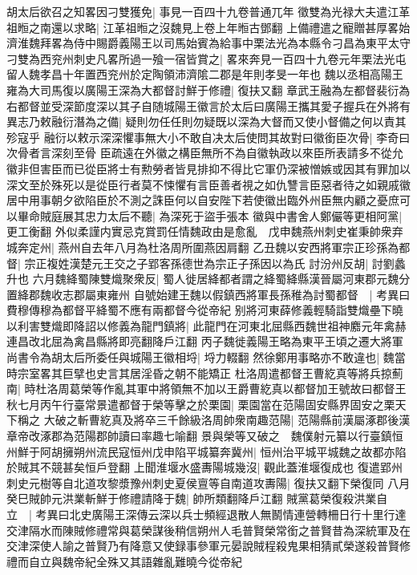 胡太后欲召之知畧因刁雙獲免|{
	事見一百四十九卷普通兀年}
徵雙為光禄大夫遣江革祖暅之南還以求略|{
	江革祖暅之沒魏見上卷上年暅古鄧翻}
上備禮遣之寵贈甚厚畧始濟淮魏拜畧為侍中賜爵義陽王以司馬始賓為給事中栗法光為本縣令刁昌為東平太守刁雙為西兖州刺史凡畧所過一飱一宿皆賞之|{
	畧來奔見一百四十九卷元年栗法光屯留人魏孝昌十年置西兖州於定陶領沛濟隂二郡是年則孝旻一年也}
魏以丞相高陽王雍為大司馬復以廣陽王深為大都督討鮮于修禮|{
	復扶又翻}
章武王融為左都督裴衍為右都督並受深節度深以其子自随城陽王徽言於太后曰廣陽王攜其愛子握兵在外將有異志乃敕融衍潛為之備|{
	疑則勿任任則勿疑既以深為大督而又使小督備之何以責其殄寇乎}
融衍以敕示深深懼事無大小不敢自决太后使問其故對曰徽銜臣次骨|{
	李奇曰次骨者言深刻至骨}
臣疏遠在外徽之構臣無所不為自徽執政以來臣所表請多不從允徽非但害臣而已從臣將士有勲勞者皆見排抑不得比它軍仍深被憎嫉或因其有罪加以深文至於殊死以是從臣行者莫不悚懼有言臣善者視之如仇讐言臣惡者待之如親戚徽居中用事朝夕欲陷臣於不測之誅臣何以自安陛下若使徽出臨外州臣無内顧之憂庶可以畢命賊庭展其忠力太后不聽|{
	為深死于盜手張本}
徽與中書舍人鄭儼等更相阿黨|{
	更工衡翻}
外似柔謹内實忌克賞罰任情魏政由是愈亂　戊申魏燕州刺史崔秉帥衆弃城奔定州|{
	燕州自去年八月為杜洛周所圍燕因肩翻}
乙丑魏以安西將軍宗正珍孫為都督|{
	宗正複姓漢楚元王交之子郢客孫德世為宗正子孫因以為氏}
討汾州反胡|{
	討劉蠡升也}
六月魏絳蜀陳雙熾聚衆反|{
	蜀人徙居絳都者謂之絳蜀絳縣漢晉屬河東郡元魏分置絳郡魏收志郡屬東雍州}
自號始建王魏以假鎮西將軍長孫稚為討蜀都督　|{
	考異曰費穆傳穆為都督平絳蜀不應有兩都督今從帝紀}
别將河東薛修義輕騎詣雙熾壘下曉以利害雙熾即降詔以修義為龍門鎮將|{
	此龍門在河東北屈縣西魏世祖神䴥元年禽赫連昌改北屈為禽昌縣將即亮翻降戶江翻}
丙子魏徙義陽王略為東平王頃之遷大將軍尚書令為胡太后所委任與城陽王徽相埒|{
	埒力輟翻}
然徐鄭用事略亦不敢違也|{
	魏當時宗室畧其巨擘也史言其居淫昏之朝不能矯正}
杜洛周遣都督王曹紇真等將兵掠薊南|{
	時杜洛周葛榮等作亂其軍中將領無不加以王爵曹紇真以都督加王號故曰都督王}
秋七月丙午行臺常景遣都督于榮等擊之於栗園|{
	栗園當在范陽固安縣界固安之栗天下稱之}
大破之斬曹紇真及將卒三千餘級洛周帥衆南趣范陽|{
	范陽縣前漢屬涿郡後漢章帝改涿郡為范陽郡帥讀曰率趣七喻翻}
景與榮等又破之　魏僕射元纂以行臺鎮恒州鮮于阿胡擁朔州流民寇恒州戊申陷平城纂奔冀州|{
	恒州治平城平城魏之故都亦陷於賊其不競甚矣恒戶登翻}
上聞淮堰水盛夀陽城幾沒|{
	觀此蓋淮堰復成也}
復遣郢州刺史元樹等自北道攻黎漿豫州刺史夏侯亶等自南道攻夀陽|{
	復扶又翻下榮復同}
八月癸巳賊帥元洪業斬鮮于修禮請降于魏|{
	帥所類翻降戶江翻}
賊黨葛榮復殺洪業自立　|{
	考異曰北史廣陽王深傳云深以兵士頻經退散人無鬭情連營轉柵日行十里行達交津隔水而陳賊修禮常與葛榮謀後稍信朔州人毛普賢榮常銜之普賢昔為深統軍及在交津深使人諭之普賢乃有降意又使録事參軍元晏說賊程殺鬼果相猜貳榮遂殺普賢修禮而自立與魏帝紀全殊又其語雜亂難曉今從帝紀}
